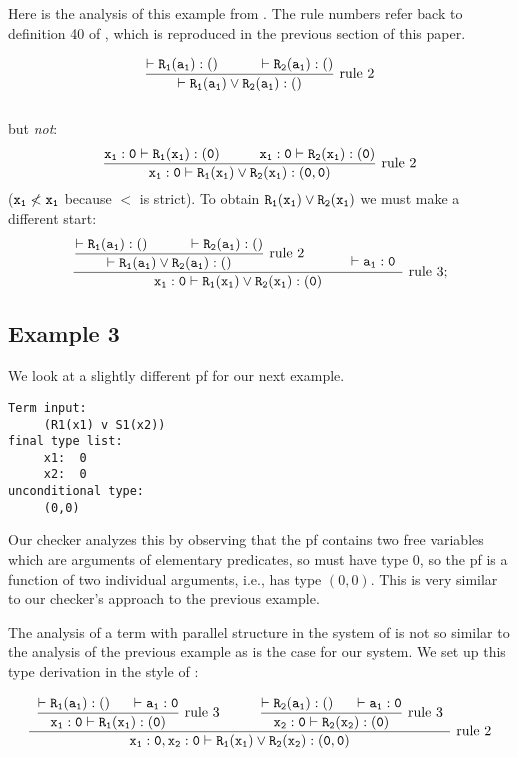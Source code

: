 \documentclass{article}
\begin{document}
Here is the analysis of this example from \cite{types40}.  The rule
numbers refer back to definition 40 of \cite{types40}, which is
reproduced in the previous section of this paper.

$$\displaystyle\frac{\tt\vdash R_1(a_1):()\hspace*{1cm}\vdash R_2(a_1):()}
               {\tt\vdash R_1(a_1)\vee R_2(a_1):()} \mbox{ rule 2}$$\\[2ex]
but {\em not}\/:
$$\displaystyle\frac{\tt x_1:0\vdash R_1(x_1):(0)\hspace*{1cm}
                 x_1:0\vdash R_2(x_1):(0)}
            {\tt x_1:0\vdash R_1(x_1)\vee R_2(x_1) : (0,0)}\mbox{ rule 2}$$
($\tt x_1\not<\tt x_1$ because $<$ is strict).
To obtain $\tt R_1(x_1)\vee R_2(x_1)$ we must make a different start:
$$\frac{\displaystyle
        \frac{\displaystyle\tt\vdash R_1(a_1):()\hspace*{1cm}\vdash R_2(a_1):()}
             {\displaystyle\tt\vdash R_1(a_1)\vee R_2(a_1):()}\mbox{ rule 2}
        \hspace*{1cm}
        \begin{array}{c}\mbox{}\\ \vdash \displaystyle\tt a_1:0\end{array}}
       {\displaystyle\tt x_1:0\vdash R_1(x_1)\vee R_2(x_1):(0)}\mbox{ rule 3};$$
\subsection{Example 3}
We look at a slightly different pf for our next example.

\begin{verbatim}
Term input:
     (R1(x1) v S1(x2))
final type list:
     x1:  0
     x2:  0
unconditional type:
     (0,0)
\end{verbatim}

Our checker analyzes this by observing that the pf contains two free
variables which are arguments of elementary predicates, so must have
type 0, so the pf is a function of two individual arguments, i.e., has
type $(0,0)$.  This is very similar to our checker's approach to the
previous example.

The analysis of a term with parallel structure in the system of
\cite{types40} is not so similar to the analysis of the previous
example as is the case for our system.  We set up this type derivation
in the style of \cite{types40}:

$$\displaystyle\frac{
\begin{array}{c}
{\displaystyle\frac{\tt \vdash R_1(a_1):() \hspace*{.5cm} \tt \vdash a_1:0}{\tt x_1:0 \vdash R_1(x_1):(0)}\mbox{ rule 3}} \hspace*{1cm}{\displaystyle\frac{\tt \vdash R_2(a_1):() \hspace*{.5cm} \tt \vdash a_1:0}{\tt x_2:0 \vdash R_2(x_2):(0)}\mbox{ rule 3}} \end{array}}
{{\tt x_1:0,x_2:0\vdash R_1(x_1)\vee R_2(x_2) : (0,0)}}\mbox{ rule 2}$$
\end{document}
